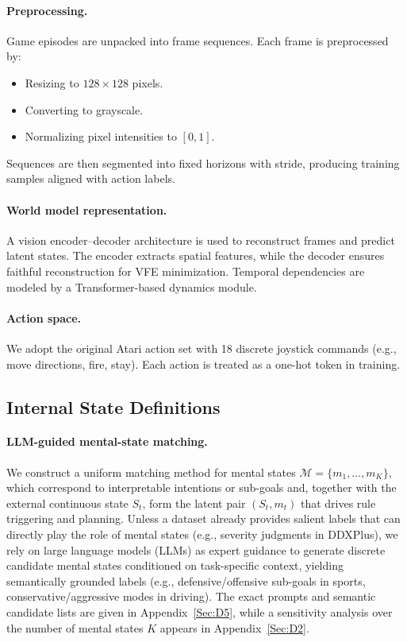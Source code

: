\documentclass{article} %
\begin{document}
\paragraph{Preprocessing.}
Game episodes are unpacked into frame sequences. Each frame is preprocessed by:
\begin{itemize}
  \item Resizing to $128\times128$ pixels.
  \item Converting to grayscale.
  \item Normalizing pixel intensities to $[0,1]$.
\end{itemize}
Sequences are then segmented into fixed horizons with stride, producing training samples aligned with action labels.

\paragraph{World model representation.}
A vision encoder–decoder architecture is used to reconstruct frames and predict latent states. The encoder extracts spatial features, while the decoder ensures faithful reconstruction for VFE minimization. Temporal dependencies are modeled by a Transformer-based dynamics module.

\paragraph{Action space.}
We adopt the original Atari action set with 18 discrete joystick commands (e.g., move directions, fire, stay). Each action is treated as a one-hot token in training.

\subsection{Internal State Definitions}
\label{Sec:B6}

\paragraph{LLM-guided mental-state matching.}
We construct a uniform matching method for mental states $\mathcal{M}=\{m_1,\dots,m_K\}$,
which correspond to interpretable intentions or sub-goals and, together with the external
continuous state $S_t$, form the latent pair $(S_t,m_t)$ that drives rule triggering and planning.
Unless a dataset already provides salient labels that can directly play the role of mental states
(e.g., severity judgments in DDXPlus), we rely on large language models (LLMs) as expert guidance
to generate discrete candidate mental states conditioned on task-specific context, yielding
semantically grounded labels (e.g., defensive/offensive sub-goals in sports, conservative/aggressive
modes in driving). The exact prompts and semantic candidate lists are given in
Appendix~\ref{Sec:D5}, while a sensitivity analysis over the number of mental states $K$
appears in Appendix~\ref{Sec:D2}.
\end{document}
